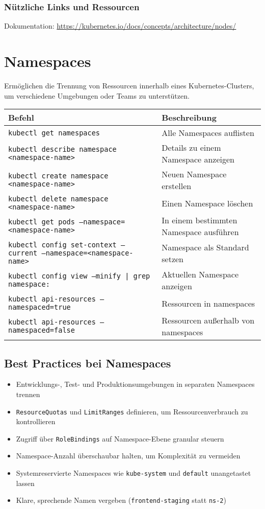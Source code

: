 \subsubsection{Nützliche Links und Ressourcen}
Dokumentation: \url{https://kubernetes.io/docs/concepts/architecture/nodes/}

\newpage
\section{Namespaces}
Ermöglichen die Trennung von Ressourcen innerhalb eines Kubernetes-Clusters, um verschiedene Umgebungen oder Teams zu unterstützen. \\

\noindent
\begin{tabular}{|p{}|p{}|}
\hline
\textbf{Befehl} & \textbf{Beschreibung} \\
\hline
\texttt{kubectl get namespaces} & Alle Namespaces auflisten \\
\texttt{kubectl describe namespace <namespace-name>} & Details zu einem Namespace anzeigen \\
\texttt{kubectl create namespace <namespace-name>} & Neuen Namespace erstellen \\
\texttt{kubectl delete namespace <namespace-name>} & Einen Namespace löschen \\
\texttt{kubectl get pods --namespace=<namespace-name>} & In einem bestimmten Namespace ausführen \\
\texttt{kubectl config set-context --current --namespace=<namespace-name>} & Namespace als Standard setzen \\
\texttt{kubectl config view --minify | grep namespace:} & Aktuellen Namespace anzeigen \\
\texttt{kubectl api-resources --namespaced=true} & Ressourcen in namespaces \\
\texttt{kubectl api-resources --namespaced=false} & Ressourcen außerhalb von namespaces\\
\hline
\end{tabular}

\subsection{Best Practices bei Namespaces}
\begin{itemize}
    \item Entwicklungs-, Test- und Produktionsumgebungen in separaten Namespaces trennen
    \item \texttt{ResourceQuotas} und \texttt{LimitRanges} definieren, um Ressourcenverbrauch zu kontrollieren
    \item Zugriff über \texttt{RoleBindings} auf Namespace-Ebene granular steuern
    \item Namespace-Anzahl überschaubar halten, um Komplexität zu vermeiden
    \item Systemreservierte Namespaces wie \texttt{kube-system} und \texttt{default} unangetastet lassen
    \item Klare, sprechende Namen vergeben (\texttt{frontend-staging} statt \texttt{ns-2})
\end{itemize}



